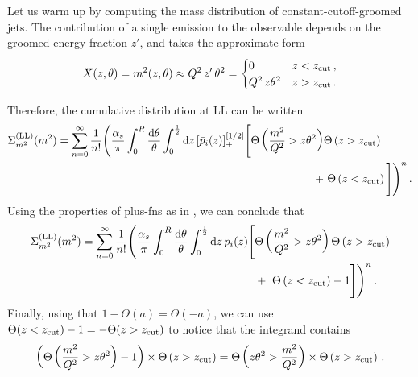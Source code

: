 \begin{example}
    \label{ex:constant-cutoff-mass}
    Let us warm up by computing the mass distribution of constant-cutoff-groomed jets.
    The contribution of a single emission to the observable depends on the groomed energy fraction \(z'\), and takes the approximate form
    \begin{align}
        X(z, \theta)
        =
        m^2(z,\theta)
        \approx
        Q^2 \, z'\,\theta^2
        =
        \begin{cases}
            0 & z < z_{\rm cut}\,,
            \\
            Q^2 \, z\theta^2 & z > z_{\rm cut}
            \,.
        \end{cases}
    \end{align}

    Therefore, the cumulative distribution at LL can be written
    \begin{equation}
    \begin{aligned}
        \label{eq:LL_mass_sd}
        \Sigma^{\rm(LL)}_{m^2}(m^2)
        =
        \sum_{n = 0}^{\infty}\frac{1}{n!}
        \Bigg(
        \frac{\alpha_s}{\pi}
        \int_0^R \frac{\dd\theta}{\theta}
        \int_0^{\frac{1}{2}} \dd z\,[\bar{p}_i(z)]_+^{[1/2]}
        \Bigg[
            \Theta\left(
                \frac{m^2}{Q^2} > z\theta^2
            \right)
            &
            \Theta\left(z > \zcut\right)
            \\
            \notag
            +
            &\,\,\Theta\left(z < \zcut\right)
        \Bigg]
        \Bigg)^n
        \,.
    \end{aligned}
    \end{equation}
    Using the properties of \glspl{plus-fn} as in , we can conclude that
    \begin{equation}
    \begin{aligned}
        \Sigma^{\rm(LL)}_{m^2}(m^2)
        =
        \sum_{n = 0}^{\infty}\frac{1}{n!}
        \Bigg(
        \frac{\alpha_s}{\pi}
        \int_0^R \frac{\dd\theta}{\theta}
        \int_0^{\frac{1}{2}} \dd z\,\bar{p}_i(z)
        \Bigg[
            &\Theta\left(
                \frac{m^2}{Q^2} > z\theta^2
            \right)
            \Theta\left(z > z_{\rm cut}\right)
            \\
            \notag
            &+
            \,\,\Theta\left(z < z_{\rm cut}\right) - 1
        \Bigg]
        \Bigg)^n
        \,.
    \end{aligned}
    \end{equation}
    Finally, using that \(1 - \Theta(a) = \Theta(-a)\), we can use \(\Theta(z < z_{\rm cut}) - 1 = -\Theta(z > z_{\rm cut})\) to notice that the integrand contains
    \begin{align}
        \left(
        \Theta\left(
            \frac{m^2}{Q^2} > z\theta^2
        \right)
        - 1
        \right)
        \times
        \Theta\left(z > z_{\rm cut}\right)
        =
        \Theta\left(
            z\theta^2 > \frac{m^2}{Q^2}
        \right)
        \times
        \Theta\left(z > z_{\rm cut}\right)
        \,.
    \end{align}


\end{example}
